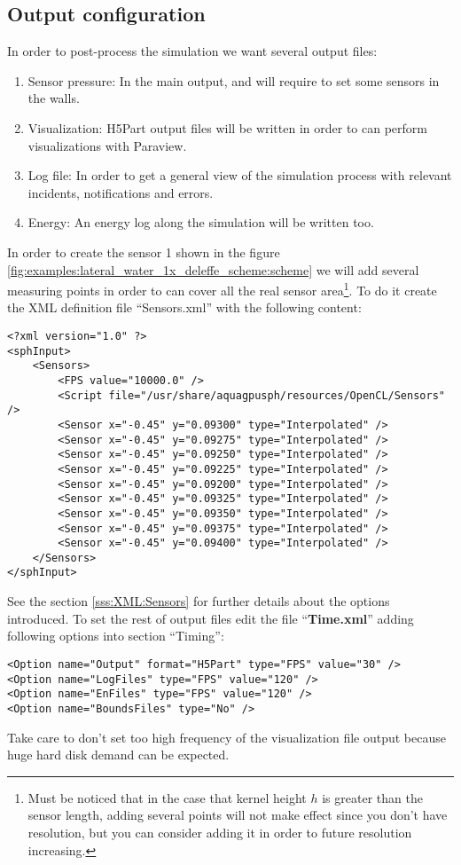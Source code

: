 \subsection{Output configuration}
\label{ss:example:lateral_water_1x_deleffe:output}
%
In order to post-process the simulation we want several output files:
%
\begin{enumerate}
	\item Sensor pressure: In the main output, and will require to set some sensors in the walls.
	\item Visualization: H5Part output files will be written in order to can perform
	visualizations with Paraview.
	\item Log file: In order to get a general view of the simulation process with relevant
	incidents, notifications and errors.
	\item Energy: An energy log along the simulation will be written too.
\end{enumerate}
%
In order to create the sensor 1 shown in the figure
\ref{fig:examples:lateral_water_1x_deleffe_scheme:scheme} we will add several measuring points in
order to can cover all the real sensor area\footnote{Must be noticed that in the case that kernel
height $h$ is greater than the sensor length, adding several points will not make effect since you
don't have resolution, but you can consider adding it in order to future resolution increasing.}.
To do it create the XML definition file ``Sensors.xml'' with the following content:
%
\begin{verbatim}
<?xml version="1.0" ?>
<sphInput>
	<Sensors>
		<FPS value="10000.0" />
		<Script file="/usr/share/aquagpusph/resources/OpenCL/Sensors" />
		<Sensor x="-0.45" y="0.09300" type="Interpolated" />
		<Sensor x="-0.45" y="0.09275" type="Interpolated" />
		<Sensor x="-0.45" y="0.09250" type="Interpolated" />
		<Sensor x="-0.45" y="0.09225" type="Interpolated" />
		<Sensor x="-0.45" y="0.09200" type="Interpolated" />
		<Sensor x="-0.45" y="0.09325" type="Interpolated" />
		<Sensor x="-0.45" y="0.09350" type="Interpolated" />
		<Sensor x="-0.45" y="0.09375" type="Interpolated" />
		<Sensor x="-0.45" y="0.09400" type="Interpolated" />
	</Sensors>
</sphInput>
\end{verbatim}
%
See the section \ref{sss:XML:Sensors} for further details about the options introduced. To set the
rest of output files edit the file ``\textbf{Time.xml}'' adding following options into section
``Timing'':
%
\begin{verbatim}
<Option name="Output" format="H5Part" type="FPS" value="30" />
<Option name="LogFiles" type="FPS" value="120" />
<Option name="EnFiles" type="FPS" value="120" />
<Option name="BoundsFiles" type="No" />
\end{verbatim}
%
Take care to don't set too high frequency of the visualization file output because huge hard disk
demand can be expected.
%
